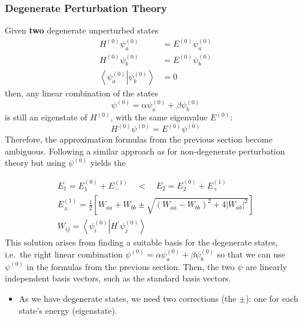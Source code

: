 \subsubsection{Degenerate Perturbation Theory}
Given \textbf{two} degenerate unperturbed states
\begin{align*}
    H^{(0)}\psi_a^{(0)}                                            & =E^{(0)}\psi_a^{(0)} \\
    H^{(0)}\psi_b^{(0)}                                            & =E^{(0)}\psi_b^{(0)} \\
    \left\langle\psi_a^{(0)}\right|\left.\psi_b^{(0)}\right\rangle & =0
\end{align*}
then, any linear combination of the states
\begin{equation*}
    \psi^{(0)}=\alpha\psi_a^{(0)}+\beta\psi_b^{(0)}
\end{equation*}
is still an eigenstate of $H^{(0)}$, with the same eigenvalue $E^{(0)}$:
\begin{equation*}
    H^{(0)}\psi^{(0)}=E^{(0)}\psi^{(0)}
\end{equation*}
Therefore, the approximation formulas from the previous section become ambiguous. Following a similar approach as for non-degenerate perturbation theory but using $\psi^{(0)}$ yields the

\newpar{}
\begin{gather*}
    E_1 = E_1^{(0)} + E_{-}^{(1)} \quad < \quad E_2 = E_2^{(0)} + E_{+}^{(1)}\\
    E_{\pm}^{(1)}=\frac{1}{2}\left[W_{aa}+W_{bb}\pm\sqrt{{(W_{aa}-W_{bb})}^{2}+4 |W_{ab}|^{2}}\right]\\
    W_{ij}=\left\langle\psi_{i}^{(0)} \right| H^{\prime} \left.\psi_{j}^{(0)}\right\rangle
\end{gather*}
This solution arises from finding a suitable basis for the degenerate states, i.e.\ the right linear combination $\psi^{(0)}=\alpha\psi_a^{(0)}+\beta\psi_b^{(0)}$ so that we can use $\psi^{(0)}$ in the formulas from the previous section. Then, the two $\psi$ are linearly independent basis vectors, such as the standard basis vectors.

\newpar{}
\begin{itemize}
    \item As we have degenerate states, we need two corrections (the $\pm$): one for each state's energy (eigenstate).
\end{itemize}

